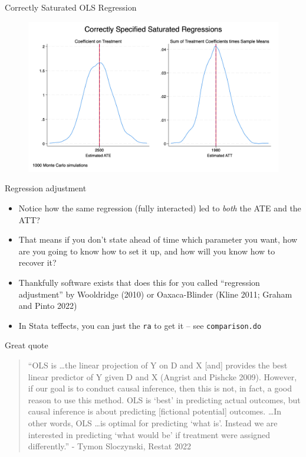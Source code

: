 \documentclass{beamer}
\begin{document}
\begin{frame}{Correctly Saturated OLS Regression}

\begin{figure}[!t]\centering
\includegraphics[scale=0.1]{./lecture_includes/combined_saturated2.jpg}
\end{figure}

\end{frame}

\begin{frame}{Regression adjustment}

\begin{itemize}

\item Notice how the same regression (fully interacted) led to \emph{both} the ATE and the ATT?
\item That means if you don't state ahead of time which parameter you want, how are you going to know how to set it up, and how will you know how to recover it?
\item Thankfully software exists that does this for you called ``regression adjustment'' by Wooldridge (2010) or Oaxaca-Blinder (Kline 2011; Graham and Pinto 2022) 
\item In Stata teffects, you can just the \texttt{ra} to get it -- see \texttt{comparison.do}

\end{itemize}

\end{frame}

\begin{frame}{Great quote}

\begin{quote}
``OLS is \dots the linear projection of Y on D and X [and] provides the best linear predictor of Y given D and X (Angrist and Pishcke 2009).  However, if our goal is to conduct causal inference, then this is not, in fact, a good reason to use this method.  OLS is `best' in predicting actual outcomes, but causal inference is about predicting [fictional potential] outcomes.  \dots In other words, OLS \dots is optimal for predicting `what is'.  Instead we are interested in predicting `what would be' if treatment were assigned differently.'' - Tymon Sloczynski, Restat 2022
\end{quote}

\end{frame}
\end{document}
